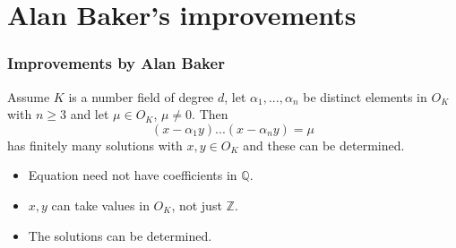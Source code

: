 \documentclass{beamer}
\newcommand{\mbb}[1]{\mathbb{#1}}
\numberwithin{equation}{section}
\begin{document}
\section{Alan Baker's improvements}
\begin{frame}
	\frametitle{Improvements by Alan Baker}
	\begin{theorem}
		Assume $K$ is a number field of degree $d$, let $\alpha_1, ..., \alpha_n$ be distinct elements in $O_K$ with $n \geq 3$ and let $\mu \in O_K$, $\mu \neq 0$. Then
		$$(x - \alpha_1 y)...(x - \alpha_n y) = \mu$$ 
		has finitely many solutions with $x, y \in O_K$ and these can be determined.
	\end{theorem}
	\begin{itemize}
		\item Equation need not have coefficients in $\mbb Q$.
		\item $x,y$ can take values in $O_K$, not just $\mbb Z$.
		\item The solutions can be determined.
	\end{itemize}
\end{frame}
\end{document}
